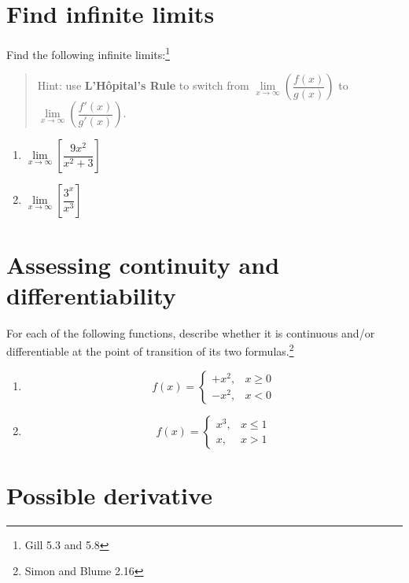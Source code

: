 \documentclass[
  letterpaper,
  DIV=11,
  numbers=noendperiod]{scrartcl}
\begin{document}
\hypertarget{find-infinite-limits}{%
\section{Find infinite limits}\label{find-infinite-limits}}

Find the following infinite limits:\footnote{Gill 5.3 and 5.8}

\begin{quote}
Hint: use \textbf{L'Hôpital's Rule} to switch from
\(\underset{x\rightarrow \infty}{\lim} \left( \dfrac{f(x)}{g(x)} \right)\)
to
\(\underset{x\rightarrow \infty}{\lim} \left( \dfrac{f'(x)}{g'(x)} \right)\).
\end{quote}

\begin{enumerate}
\def\labelenumi{\alph{enumi}.}
\item
  \(\underset{x\rightarrow \infty}{\lim}\left[ \dfrac{9x^2}{x^2 +3} \right]\)
\item
  \(\underset{x\rightarrow \infty}{\lim} \left[ \dfrac{3^x}{x^3} \right]\)
\end{enumerate}

\hypertarget{assessing-continuity-and-differentiability}{%
\section{Assessing continuity and
differentiability}\label{assessing-continuity-and-differentiability}}

For each of the following functions, describe whether it is continuous
and/or differentiable at the point of transition of its two
formulas.\footnote{Simon and Blume 2.16}

\begin{enumerate}
\def\labelenumi{\alph{enumi}.}
\item
  \[f(x) = \begin{cases} 
     + x^2, & x \geq 0 \\
     - x^2, & x < 0
  \end{cases}\]
\item
  \[f(x) = \begin{cases} 
     x^3, & x \leq 1 \\
     x, & x > 1
  \end{cases}\]
\end{enumerate}

\hypertarget{possible-derivative}{%
\section{Possible derivative}\label{possible-derivative}}
\end{document}

